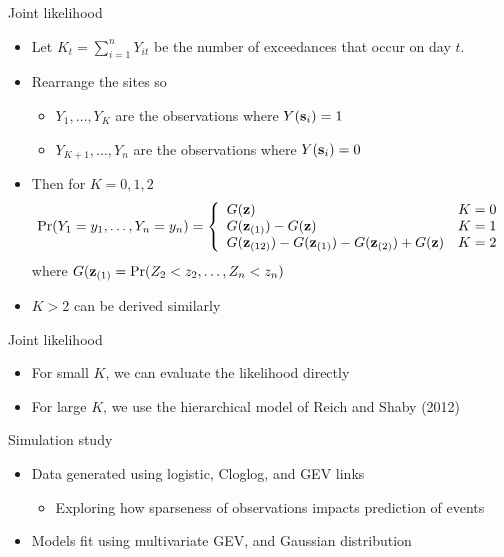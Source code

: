 \documentclass{beamer}
\begin{document}
\begin{frame}{Joint likelihood}
  \begin{itemize} \setlength{\itemsep}{0.5em}
    \item Let $K_t = \sum_{i = 1}^n Y_{it}$ be the number of exceedances that occur on day $t$.
    \item Rearrange the sites so
    \begin{itemize}
      \item $Y_1, \ldots, Y_K$ are the observations where $Y(\mbox{\bf s}_i) = 1$
      \item $Y_{K+1}, \ldots, Y_n$ are the observations where $Y(\mbox{\bf s}_i) = 0$
    \end{itemize}
    \item Then for $K = 0, 1, 2$
    {\scriptsize
    \begin{align*}
      \Pr(Y_1 = y_1, \ldots, Y_n = y_n) = \left\{ \begin{array}{ll}
        G(\mbox{\bf z})  & K = 0\\
        G(\mbox{\bf z}_{(1)}) - G(\mbox{\bf z}) & K = 1\\
        G(\mbox{\bf z}_{(12)}) - G(\mbox{\bf z}_{(1)}) - G(\mbox{\bf z}_{(2)}) + G(\mbox{\bf z}) & K =2
      \end{array}\right.
    \end{align*}
    }
    where $G(\mbox{\bf z}_{(1)} = \Pr(Z_2 < z_2, \ldots, Z_n < z_n)$
    \item $K > 2$ can be derived similarly
  \end{itemize}
\end{frame}

\begin{frame}{Joint likelihood}
  \begin{itemize} \setlength{\itemsep}{0.5em}
    \item For small $K$, we can evaluate the likelihood directly
    \item For large $K$, we use the hierarchical model of Reich and Shaby (2012)
  \end{itemize}
\end{frame}

\begin{frame}{Simulation study}
  \begin{itemize} \setlength{\itemsep}{0.5em}
    \item Data generated using logistic, Cloglog, and GEV links
    \begin{itemize}
      \item Exploring how sparseness of observations impacts prediction of events
    \end{itemize}
    \item Models fit using multivariate GEV, and Gaussian distribution
  \end{itemize}
\end{frame}
\end{document}

